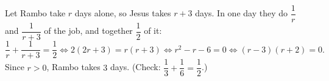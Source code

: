 Let Rambo take $r$ days alone, so Jesus takes $r+3$ days. In one day they do $\dfrac1r$ and $\dfrac1{r+3}$ of the job, and together $\dfrac12$ of it:
\[\dfrac1r+\dfrac1{r+3}=\dfrac12\iff2(2r+3)=r(r+3)\iff r^2-r-6=0\iff(r-3)(r+2)=0.\]
Since $r>0$, Rambo takes $\boxed{3}$ days. (Check: $\dfrac13+\dfrac16=\dfrac12$.)
